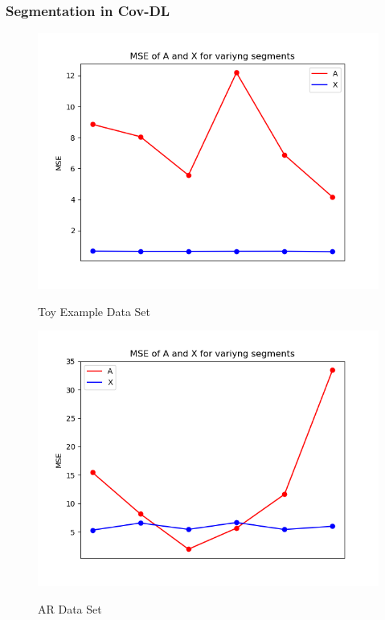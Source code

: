 \subsubsection{Segmentation in Cov-DL}
\begin{figure}[H]
\centering
    \begin{minipage}[t]{.45\textwidth}
        \centering
\includegraphics[scale=0.5]{figures/chapter6/Mix_Error_vary_seg_m8_k16_L1000.png}
\label{fig:seg_mix}
\caption{Toy Example Data Set}
    \end{minipage} 
    \hfill
    \begin{minipage}[t]{.45\textwidth}
        \centering
\includegraphics[scale=0.5]{figures/chapter6/AR_Error_vary_seg_m8_k16_L1000.png}
\label{fig:seg_AR}
\caption{AR Data Set}
    \end{minipage}
\end{figure}
\noindent


